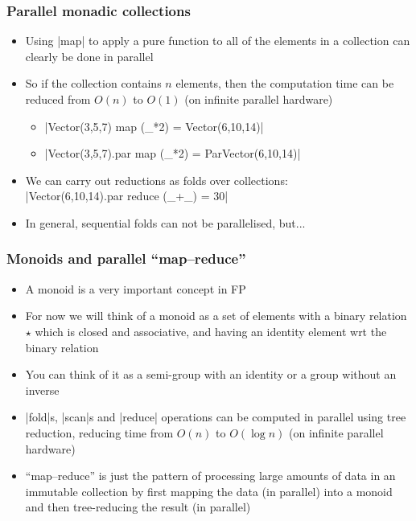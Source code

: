 \documentclass[mathserif,handout]{beamer}
\begin{document}
\begin{frame}[fragile]
  \frametitle{Parallel monadic collections}
  \begin{itemize}
  \item Using |map| to apply a \alert{pure} function to all of the elements in a collection can clearly be done in parallel
  \item So if the collection contains $n$ elements, then the computation time can be reduced from $O(n)$ to $O(1)$ (on infinite parallel hardware)
    \begin{itemize}
    \item |Vector(3,5,7) map (_*2) = Vector(6,10,14)|
    \item |Vector(3,5,7).par map (_*2) = ParVector(6,10,14)|
    \end{itemize}
    \item We can carry out \alert{reductions} as \alert{folds} over collections:\\
      |Vector(6,10,14).par reduce (_+_) = 30|
      \item In general, sequential folds can not be parallelised, but...
  \end{itemize}
\end{frame}

\begin{frame}[fragile]
  \frametitle{Monoids and parallel ``map--reduce''}
  \begin{itemize}
  \item A \alert{monoid} is a very important concept in FP
  \item For now we will think of a monoid as a \alert{set} of elements with a \alert{binary relation} $\star$ which is \alert{closed} and \alert{associative}, and having an \alert{identity} element wrt the binary relation
  \item You can think of it as a \alert{semi-group} with an identity or a \alert{group} without an inverse
  \item |fold|s, |scan|s and |reduce| operations can be computed in parallel using \alert{tree reduction}, reducing time from $O(n)$ to $O(\log n)$ (on infinite parallel hardware)
  \item ``\alert{map--reduce}'' is just the pattern of processing large amounts of data in an immutable collection by first \alert{map}ping the data (in parallel) into a monoid and then tree-\alert{reduc}ing the result (in parallel)
  \end{itemize}
\end{frame}
\end{document}

